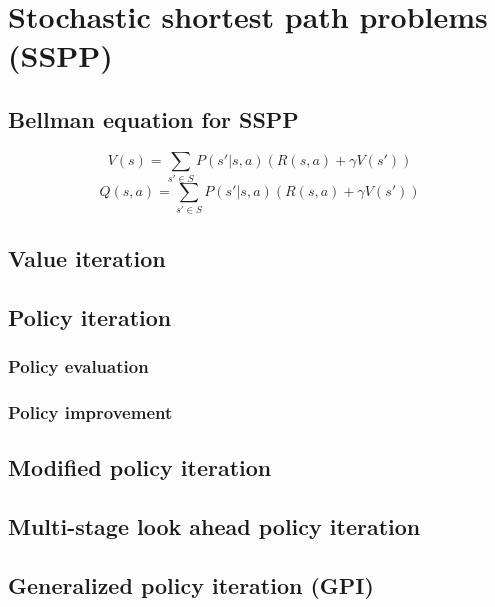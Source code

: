 \section{Stochastic shortest path problems (SSPP)}

\subsection{Bellman equation for SSPP}

\begin{equation}
    V(s) = \sum_{s' \in S} P(s' | s, a) \left( R(s, a) + \gamma V(s') \right)
\end{equation}
\begin{equation}
    Q(s, a) = \sum_{s' \in S} P(s' | s, a) \left( R(s, a) + \gamma V(s') \right)
\end{equation}

\subsection{Value iteration}

\subsection{Policy iteration}

\subsubsection{Policy evaluation}

\subsubsection{Policy improvement}

\subsection{Modified policy iteration}

\subsection{Multi-stage look ahead policy iteration}

\subsection{Generalized policy iteration (GPI)}
